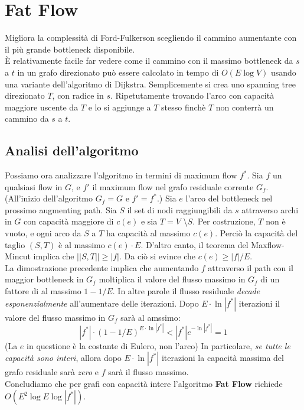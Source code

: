 \section{Fat Flow}
Migliora la complessità di Ford-Fulkerson scegliendo il cammino aumentante con
il più grande bottleneck disponibile.\\

È relativamente facile far vedere come il cammino con il massimo bottleneck da
$s$ a $t$ in un grafo direzionato può essere calcolato in tempo di $O(E\log{V})$
usando una variante dell'algoritmo di Dijkstra. Semplicemente si crea uno
spanning tree direzionato $T$, con radice in $s$. Ripetutamente trovando l'arco
con capacità maggiore uscente da $T$ e lo si aggiunge a $T$ stesso finchè $T$
non conterrà un cammino da $s$ a $t$.

\subsection{Analisi dell'algoritmo}

Possiamo ora analizzare l'algoritmo in termini di maximum flow $f^{*}$. Sia $f$
un qualsiasi flow in $G$, e $f'$ il maximum flow nel grafo residuale corrente
$G_f$. (All'inizio dell'algoritmo $G_f = G$ e $f' = f^{*}$.) Sia $e$ l'arco del
bottleneck nel prossimo augmenting path. Sia $S$ il set di nodi raggiungibili da
$s$ attraverso archi in $G$ con capacità maggiore di $c(e)$ e sia $T = V$
\textbackslash $S$. Per costruzione, $T$ non è vuoto, e ogni arco da $S$ a $T$
ha capacità al massimo $c(e)$. Perciò la capacità del taglio $(S,T)$ è al
massimo $c(e) \cdot E$. D'altro canto, il teorema del Maxflow-Mincut implica che
$||S,T|| \geq |f|$. Da ciò si evince che $c(e) \geq |f|/E$.\\

La dimostrazione precedente implica che aumentando $f$ attraverso il path con il
maggior bottleneck in $G_f$ moltiplica il valore del flusso massimo in $G_f$ di
un fattore di al massimo $1 - 1/E$. In altre parole il flusso residuale
\textit{decade esponenzialmente} all'aumentare delle iterazioni. Dopo $E \cdot
    \ln{|f^{*}|}$ iterazioni il valore del flusso massimo in $G_f$ sarà al amssimo:
$$
    |f^{*}|\cdot(1-1/E)^{E\cdot \ln{|f^{*}|}} < |f^{*}|e^{-\ln{|f^{*}|}} = 1
$$
(La $e$ in questione è la costante di Eulero, non l'arco) In particolare,
\textit{se tutte le capacità sono interi}, allora dopo $E\cdot \ln{|f^{*}|}$
iterazioni la capacità massima del grafo residuale sarà \textit{zero} e $f$ sarà
il flusso massimo.\\

Concludiamo che per grafi con capacità intere l'algoritmo \textbf{Fat Flow}
richiede $O(E^2\log{E}\log{|f^{*}|})$.